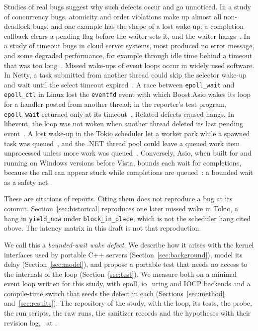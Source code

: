 Studies of real bugs suggest why such defects occur and go unnoticed. In a study of concurrency
bugs, atomicity and order violations make up almost all non-deadlock bugs, and one example has
the shape of a lost wake-up: a completion callback clears a pending flag before the waiter sets
it, and the waiter hangs~\cite{lu2008learning}. In a study of timeout bugs in cloud server
systems, most produced no error message, and some degraded performance, for example through
idle time behind a timeout that was too long~\cite{dai2018understanding}. Missed wake-ups of
event loops occur in widely used software. In Netty, a task submitted from another thread
could skip the selector wake-up and wait until the select timeout
expired~\cite{lee2016nettywakeup}. A race between \texttt{epoll\_wait} and \texttt{epoll\_ctl}
in Linux lost the \texttt{eventfd} event with which Boost.Asio wakes its loop for a handler
posted from another thread; in the reporter's test program, \texttt{epoll\_wait} returned only
at its timeout~\cite{neunhoffer2019epollbug,neunhoffer2020asio,penyaev2020epollfix}. Related
defects caused hangs. In libevent, the loop was not woken when another thread deleted its last
pending event~\cite{khuzhin2018libevent}. A lost wake-up in the Tokio scheduler let a worker
park while a spawned task was queued~\cite{lerche2019tokio}, and the .NET thread pool could
leave a queued work item unprocessed unless more work was queued~\cite{sadov2025threadpool}.
Conversely, Asio, when built for and running on Windows versions before Vista, bounds each wait
for completions, because the call can appear stuck while completions are
queued~\cite{kohlhoff2026asioiocp}: a bounded wait as a safety net.

These are citations of reports. Citing them does not reproduce a bug at its commit.
Section~\ref{sec:historical} reproduces one later missed wake in Tokio, a hang in
\texttt{yield\_now} under \texttt{block\_in\_place}, which is not the scheduler hang cited
above. The latency matrix in this draft is not that reproduction.

We call this a \emph{bounded-wait wake defect}. We describe how it arises with the kernel
interfaces used by portable C++ servers (Section~\ref{sec:background}), model its delay
(Section~\ref{sec:model}), and propose a portable test that needs no access to the internals
of the loop (Section~\ref{sec:test}). We measure both on a minimal event loop written for this
study, with epoll, io\_uring and IOCP backends and a compile-time switch that seeds the defect
in each (Sections~\ref{sec:method} and~\ref{sec:results}). The repository of the
study, with the loop, its tests, the probe, the run scripts, the raw runs, the sanitizer records and
the hypotheses with their revision log, \PaperRepoAvailability\ at \PaperRepo.


